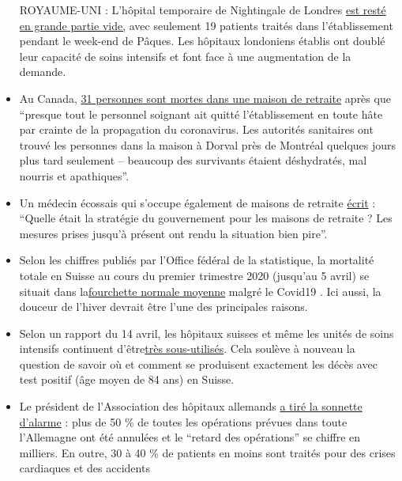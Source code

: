 \begin{itemize}
  ROYAUME-UNI : L'hôpital temporaire de Nightingale de Londres
  \href{https://www.hsj.co.uk/service-design/exclusive-nightingale-largely-empty-as-icus-handle-surge/7027398.article}{est
  resté en grande partie vide,} avec seulement 19 patients traités dans
  l'établissement pendant le week-end de Pâques. Les hôpitaux londoniens
  établis ont doublé leur capacité de soins intensifs et font face à une
  augmentation de la demande.
\item
  Au Canada, \href{https://orf.at/stories/3162365/}{31 personnes sont
  mortes dans une maison de retraite} après que ``presque tout le
  personnel soignant ait quitté l'établissement en toute hâte par
  crainte de la propagation du coronavirus. Les autorités sanitaires ont
  trouvé les personnes dans la maison à Dorval près de Montréal quelques
  jours plus tard seulement -- beaucoup des survivants étaient
  déshydratés, mal nourris et apathiques''.
\item
  Un médecin écossais qui s'occupe également de maisons de retraite
  \href{https://drmalcolmkendrick.org/2020/04/17/care-homes-and-covid19/}{écrit}
  : ``Quelle était la stratégie du gouvernement pour les maisons de
  retraite ? Les mesures prises jusqu'à présent ont rendu la situation
  bien pire''.
\item
  Selon les chiffres publiés par l'Office fédéral de la statistique, la
  mortalité totale en Suisse au cours du premier trimestre 2020
  (jusqu'au 5 avril) se situait dans
  la\href{https://swprs.files.wordpress.com/2020/04/ch-mortalitaet-q1-2020.pdf}{fourchette
  normale moyenne} malgré le Covid19 . Ici aussi, la douceur de l'hiver
  devrait être l'une des principales raisons.
\item
  Selon un rapport du 14 avril, les hôpitaux suisses et même les unités
  de soins intensifs continuent
  d'être\href{https://swprs.files.wordpress.com/2020/04/intensivbettenbelegung-schweiz-2020-04-14.png}{très
  sous-utilisés}. Cela soulève à nouveau la question de savoir où et
  comment se produisent exactement les décès avec test positif (âge
  moyen de 84 ans) en Suisse.
\item
  Le président de l'Association des hôpitaux allemands
  \href{https://www.bz-berlin.de/deutschland/kliniken-verband-schlaegt-alarm-wegen-corona-regeln}{a
  tiré la sonnette d'alarme} : plus de 50 \% de toutes les opérations
  prévues dans toute l'Allemagne ont été annulées et le ``retard des
  opérations'' se chiffre en milliers. En outre, 30 à 40 \% de patients
  en moins sont traités pour des crises cardiaques et des accidents

\end{itemize}
